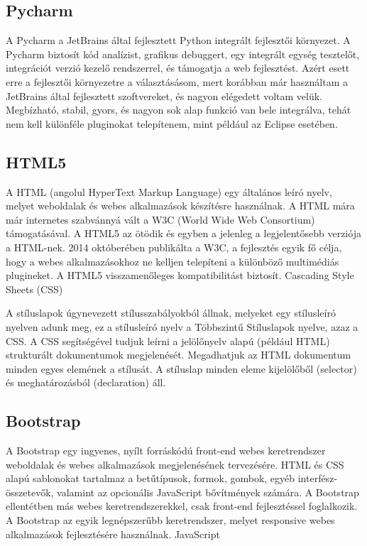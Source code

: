 \subsection{Pycharm}

A Pycharm a JetBrains által fejlesztett Python integrált fejlesztői környezet. A Pycharm biztosít kód analízist, grafikus debuggert, egy integrált egység tesztelőt, integrációt verzió kezelő rendszerrel, és támogatja a web fejlesztést.
Azért esett erre a fejlesztői környezetre a választásásom, mert korábban már használtam a JetBrains által fejlesztett szoftvereket, és nagyon elégedett voltam velük. Megbízható, stabil, gyors, és nagyon sok alap funkció van bele integrálva, tehát nem kell különféle pluginokat telepítenem, mint például az Eclipse esetében.

\subsection{HTML5}

A HTML (angolul HyperText Markup Language) egy általános leíró nyelv, melyet weboldalak és webes alkalmazások készítésre használnak. A HTML mára már internetes szabvánnyá vált a W3C (World Wide Web Consortium) támogatásával.
A HTML5 az ötödik és egyben a jelenleg a legjelentősebb verziója a HTML-nek. 2014 októberében publikálta a W3C, a fejlesztés egyik fő célja, hogy a webes alkalmazásokhoz ne kelljen telepíteni a különböző multimédiás plugineket. A HTML5 visszamenőleges kompatibilitást biztosít.
Cascading Style Sheets (CSS)

A stíluslapok úgynevezett stílusszabályokból állnak, melyeket egy stílusleíró nyelven adunk meg, ez a stílusleíró nyelv a Többszintű Stíluslapok nyelve, azaz a CSS. A CSS segítségével tudjuk leírni a jelölőnyelv alapú (például HTML) strukturált dokumentumok megjelenését. Megadhatjuk az HTML dokumentum minden egyes elemének a stílusát. A stíluslap minden eleme kijelölőből (selector) és meghatározásból (declaration) áll.

\subsection{Bootstrap}

A Bootstrap egy ingyenes, nyílt forráskódú front-end webes keretrendszer weboldalak és webes alkalmazások megjelenésének tervezésére. HTML és CSS alapú sablonokat tartalmaz a betűtípusok, formok, gombok, egyéb interfész-összetevők, valamint az opcionális JavaScript bővítmények számára. A Bootstrap ellentétben más webes keretrendszerekkel, csak front-end fejlesztéssel foglalkozik. A Bootstrap az egyik legnépszerűbb keretrendszer, melyet responsive webes alkalmazások fejlesztésére használnak.
JavaScript

